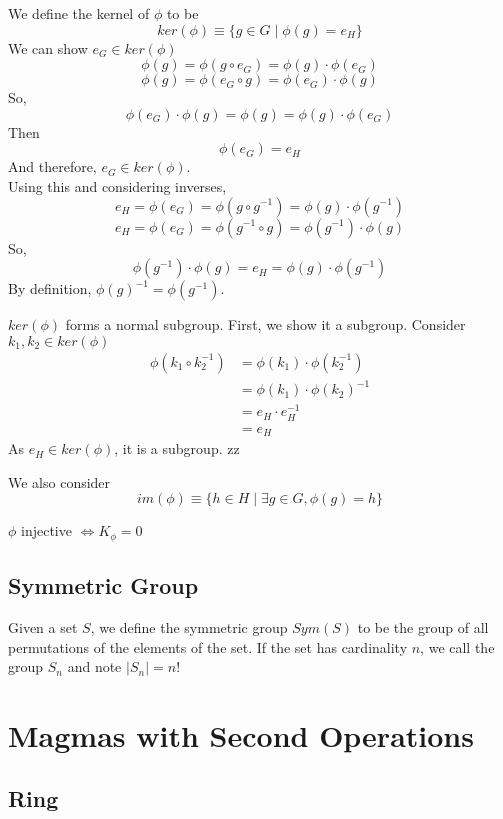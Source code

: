 \documentclass[a4paper]{scrartcl}
\begin{document}
We define the kernel of $\phi$ to be
$$ker(\phi)\equiv\{g\in G \mid \phi(g) = e_{H}\}$$
We can show $e_{G} \in ker(\phi)$
$$\phi(g) = \phi(g \circ e_{G}) = \phi(g) \cdot \phi(e_{G})$$
$$\phi(g) = \phi(e_{G} \circ g) = \phi(e_{G}) \cdot \phi(g)$$
So,
$$\phi(e_{G}) \cdot \phi(g) = \phi(g) = \phi(g) \cdot \phi(e_{G})$$
Then
$$\phi(e_{G}) = e_{H}$$
And therefore, $e_{G}\in ker(\phi)$.\\




Using this and considering inverses,
$$e_{H} = \phi(e_{G}) = \phi (g \circ g^{-1}) = \phi(g) \cdot \phi(g^{-1})$$
$$e_{H} = \phi(e_{G}) = \phi (g^{-1} \circ g) = \phi(g^{-1}) \cdot \phi(g)$$
So,
$$\phi(g^{-1}) \cdot \phi(g) = e_{H} = \phi(g) \cdot \phi(g^{-1})$$
By definition, $\phi(g)^{-1} = \phi(g^{-1})$.

$ker(\phi)$ forms a normal subgroup. First, we show it a subgroup. Consider $k_{1}, k_{2}\in ker(\phi)$
\begin{align*}
\phi(k_{1} \circ k_{2}^{-1}) & =  \phi(k_{1}) \cdot \phi(k_{2}^{-1}) \\ 
& = \phi(k_{1}) \cdot \phi(k_{2})^{-1} \\
& = e_{H} \cdot e_{H}^{-1} \\
& = e_{H}
\end{align*}
As $e_{H} \in ker(\phi)$, it is a subgroup.
zz

We also consider
$$im(\phi)\equiv\{h\in H \mid \exists g\in G, \phi(g) = h\}$$


$\phi$ injective $\iff K_{\phi}=0$  



\subsection{Symmetric Group}
Given a set $S$, we define the symmetric group $Sym(S)$ to be the group of all permutations of the elements of the set.
If the set has cardinality $n$, we call the group $S_{n}$ and note $\mid S_{n} \mid = n!$



\section {Magmas with Second Operations}

\subsection{Ring}
\end{document}
